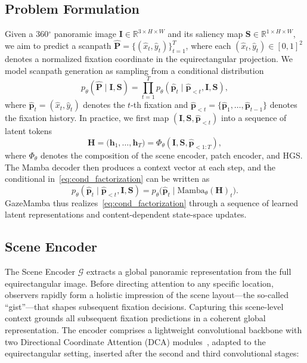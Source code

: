 \documentclass[sigconf]{acmart}
\begin{document}
\subsection{Problem Formulation}
Given a 360$^\circ$ panoramic image $\mathbf{I} \in \mathbb{R}^{3 \times H \times W}$ and its saliency map $\mathbf{S} \in \mathbb{R}^{1 \times H \times W}$, we aim to predict a scanpath $\hat{\mathbf{P}} = \{(\hat{x}_t, \hat{y}_t)\}_{t=1}^{T}$, where each $(\hat{x}_t, \hat{y}_t) \in [0,1]^2$ denotes a normalized fixation coordinate in the equirectangular projection. We model scanpath generation as sampling from a conditional distribution
\begin{equation}
  p_\theta(\hat{\mathbf{P}} \mid \mathbf{I}, \mathbf{S})
  = \prod_{t=1}^{T} p_\theta(\hat{\mathbf{p}}_t \mid \hat{\mathbf{p}}_{<t}, \mathbf{I}, \mathbf{S}),
  \label{eq:cond_factorization}
\end{equation}
where $\hat{\mathbf{p}}_t = (\hat{x}_t, \hat{y}_t)$ denotes the $t$-th fixation and $\hat{\mathbf{p}}_{<t} = \{\hat{\mathbf{p}}_1,\dots,\hat{\mathbf{p}}_{t-1}\}$ denotes the fixation history. In practice, we first map $(\mathbf{I}, \mathbf{S}, \hat{\mathbf{p}}_{<t})$ into a sequence of latent tokens
\begin{equation}
  \mathbf{H}
  = \bigl(\mathbf{h}_1,\dots,\mathbf{h}_T\bigr)
  = \Phi_\theta(\mathbf{I}, \mathbf{S}, \hat{\mathbf{p}}_{<1:T}),
\end{equation}
where $\Phi_\theta$ denotes the composition of the scene encoder, patch encoder, and HGS. The Mamba decoder then produces a context vector at each step, and the conditional in~\eqref{eq:cond_factorization} can be written as
\begin{equation}
  p_\theta(\hat{\mathbf{p}}_t \mid \hat{\mathbf{p}}_{<t}, \mathbf{I}, \mathbf{S})
  = p_\theta\bigl(\hat{\mathbf{p}}_t \mid \mathrm{Mamba}_\theta(\mathbf{H})_t\bigr).
\end{equation}
GazeMamba thus realizes~\eqref{eq:cond_factorization} through a sequence of learned latent representations and content-dependent state-space updates.

\subsection{Scene Encoder}
The Scene Encoder $\mathcal{G}$ extracts a global panoramic representation from the full equirectangular image. Before directing attention to any specific location, observers rapidly form a holistic impression of the scene layout—the so-called ``gist''—that shapes subsequent fixation decisions. Capturing this scene-level context grounds all subsequent fixation predictions in a coherent global representation. The encoder comprises a lightweight convolutional backbone with two Directional Coordinate Attention (DCA) modules~\cite{hou2021coordinate}, adapted to the equirectangular setting, inserted after the second and third convolutional stages:
\end{document}
